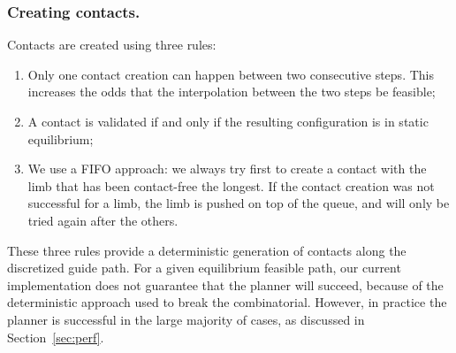 \subsubsection{Creating contacts.}
Contacts are created using three rules:
\begin{enumerate}
\item Only one contact creation can happen between two consecutive steps. This increases the odds that the interpolation between the two steps be feasible;
\item A contact is validated if and only if the resulting configuration is in static equilibrium; 
\item We use a FIFO approach:  we always try first to create a contact with the limb that has been contact-free the longest. If the contact creation
was not successful for a limb, the limb is pushed on top of the queue, and will only be tried again after the others.
\end{enumerate}

These three rules provide a deterministic generation of contacts along the discretized guide path.
For a given \gls{equilibrium feasible} path, our current implementation does not guarantee that the planner will succeed, because
of the deterministic approach used to break the combinatorial.
However, in practice the planner is successful in the large majority of cases, as discussed in Section~\ref{sec:perf}.
